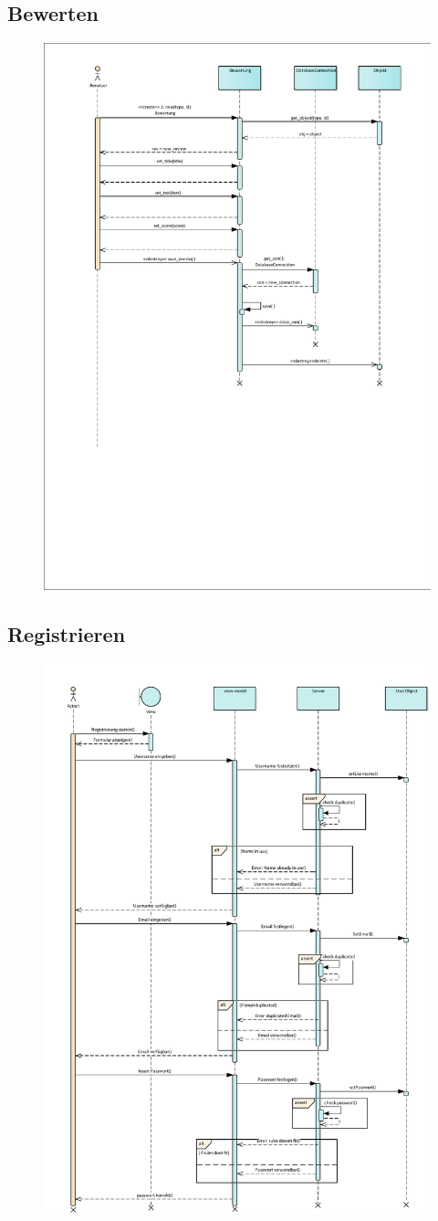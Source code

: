\subsection*{Bewerten}
\begin{figure}[h!]
	\centering
	\includegraphics[width=0.8\linewidth]{docs/6_Sequenzdiagramme/Richard/sequenzdiagramm_bewerten.pdf}
	\label{fig:SeqDia_Bewerten}
\end{figure}

\vfill
\pagebreak

\subsection*{Registrieren}
\begin{figure}[h!]
	\centering
	\includegraphics[width=0.8\linewidth]{docs/6_Sequenzdiagramme/Markus/Registrieren.pdf}
	\label{fig:SeqDia_Registrieren}
\end{figure}
